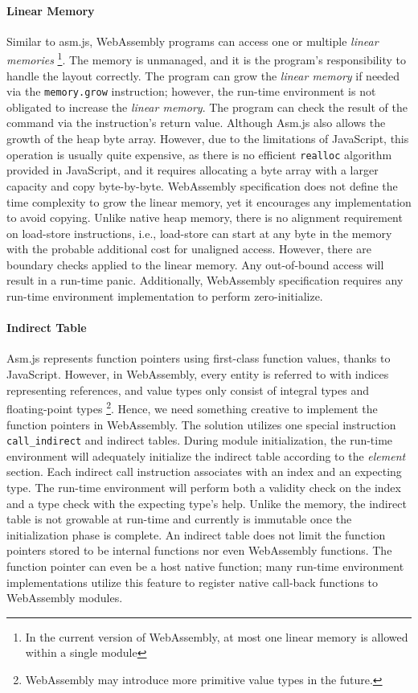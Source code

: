 \paragraph{Linear Memory}
Similar to asm.js, WebAssembly programs can access one or multiple \emph{linear memories} \footnote{In the current version of WebAssembly, at most one linear memory is allowed within a single module}. The memory is unmanaged, and it is the program's responsibility to handle the layout correctly. The program can grow the \emph{linear memory} if needed via the \texttt{memory.grow} instruction; however, the run-time environment is not obligated to increase the \emph{linear memory}. The program can check the result of the command via the instruction's return value. Although Asm.js also allows the growth of the heap byte array. However, due to the limitations of JavaScript, this operation is usually quite expensive, as there is no efficient \texttt{realloc} algorithm provided in JavaScript, and it requires allocating a byte array with a larger capacity and copy byte-by-byte. WebAssembly specification does not define the time complexity to grow the linear memory, yet it encourages any implementation to avoid copying.  Unlike native heap memory, there is no alignment requirement on load-store instructions, i.e., load-store can start at any byte in the memory with the probable additional cost for unaligned access. However, there are boundary checks applied to the linear memory. Any out-of-bound access will result in a run-time panic. Additionally, WebAssembly specification requires any run-time environment implementation to perform zero-initialize.

\paragraph{Indirect Table}
Asm.js represents function pointers using first-class function values, thanks to JavaScript. However, in WebAssembly, every entity is referred to with indices representing references, and value types only consist of integral types and floating-point types \footnote{WebAssembly may introduce more primitive value types in the future.}. Hence, we need something creative to implement the function pointers in WebAssembly. The solution utilizes one special instruction \texttt{call\_indirect} and indirect tables. During module initialization, the run-time environment will adequately initialize the indirect table according to the \emph{element} section. Each indirect call instruction associates with an index and an expecting type. The run-time environment will perform both a validity check on the index and a type check with the expecting type's help. Unlike the memory, the indirect table is not growable at run-time and currently is immutable once the initialization phase is complete. An indirect table does not limit the function pointers stored to be internal functions nor even WebAssembly functions. The function pointer can even be a host native function; many run-time environment implementations utilize this feature to register native call-back functions to WebAssembly modules.

